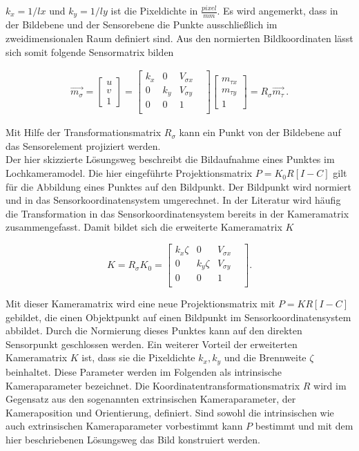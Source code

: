 $k_x=1/lx$ und $k_y=1/ly$ ist die Pixeldichte in $\frac{pixel}{mm}$. Es wird angemerkt, dass in der Bildebene und der Sensorebene die Punkte ausschließlich im zweidimensionalen Raum definiert sind. Aus den normierten Bildkoordinaten lässt sich somit folgende Sensormatrix bilden

\begin{gather}
	\overrightarrow{m_\sigma}=\begin{bmatrix}u \\v\\1 \end{bmatrix}=
	\begin{bmatrix}
		k_x&0&V_{\sigma x}\\
		0&k_y&V_{\sigma y}\\
		0&0&1&\\
	\end{bmatrix}
	\begin{bmatrix}m_{\tau x}\\ m_{\tau y}\\ 1\end{bmatrix}= R_\sigma \vec{m_\tau}\,.
\end{gather}

Mit Hilfe der Transformationsmatrix $R_\sigma$ kann ein Punkt von der Bildebene auf das Sensorelement projiziert werden.\\

Der hier skizzierte Lösungsweg beschreibt die Bildaufnahme eines Punktes im Lochkameramodel. Die hier eingeführte Projektionsmatrix $P=K_0R[I -C]$ gilt für die Abbildung eines Punktes auf den Bildpunkt. Der Bildpunkt wird normiert und in das Sensorkoordinatensystem umgerechnet. In der Literatur wird häufig die Transformation in das Sensorkoordinatensystem bereits in der Kameramatrix zusammengefasst. Damit bildet sich die erweiterte Kameramatrix $K$

\begin{equation}
K=	R_\sigma K_0=  \begin{bmatrix}
k_x \zeta & 0 & V_{\sigma x}\\
0 & k_y \zeta & V_{\sigma y}\\
0 & 0   & 1 &\\
\end{bmatrix}.
\end{equation}

Mit dieser Kameramatrix wird eine neue Projektionsmatrix mit $P=KR[I -C]$ gebildet, die einen Objektpunkt auf einen Bildpunkt im Sensorkoordinatensystem abbildet. Durch die Normierung dieses Punktes kann auf den direkten Sensorpunkt geschlossen werden.  Ein weiterer Vorteil der erweiterten Kameramatrix $K$ ist, dass sie die Pixeldichte $k_x,k_y$ und die Brennweite $\zeta$ beinhaltet. Diese Parameter werden im Folgenden als intrinsische Kameraparameter bezeichnet. Die Koordinatentransformationsmatrix $R$ wird im Gegensatz aus den sogenannten extrinsischen Kameraparameter, der Kameraposition und Orientierung, definiert. Sind sowohl die intrinsischen wie auch extrinsischen Kameraparameter vorbestimmt kann $P$ bestimmt und mit dem hier beschriebenen Lösungsweg das Bild konstruiert werden. %


